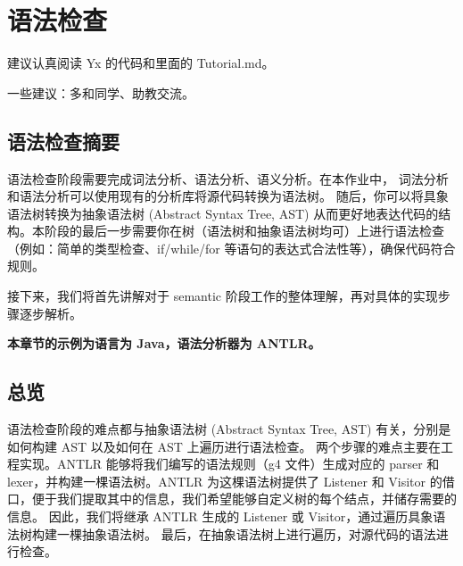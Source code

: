 \chapter{语法检查}

\begin{introduction}
    \item 建议认真阅读 Yx\cite{Yx} 的代码和里面的 Tutorial.md。
    \item 一些建议：多和同学、助教交流。
\end{introduction}


\section{语法检查摘要}
语法检查阶段需要完成词法分析、语法分析、语义分析。在本作业中，
词法分析和语法分析可以使用现有的分析库将源代码转换为语法树。
随后，你可以将具象语法树转换为抽象语法树 (Abstract Syntax Tree, AST)
从而更好地表达代码的结构。本阶段的最后一步需要你在树（语法树和抽象语法树均可）上进行语法检查
（例如：简单的类型检查、if/while/for 等语句的表达式合法性等），确保代码符合规则。

接下来，我们将首先讲解对于 semantic 阶段工作的整体理解，再对具体的实现步骤逐步解析。

\begin{remark}
    \textbf{本章节的示例为语言为 Java，语法分析器为 ANTLR。}
\end{remark}

\section{总览}
语法检查阶段的难点都与抽象语法树 (Abstract Syntax Tree, AST)
有关，分别是如何构建 AST 以及如何在 AST 上遍历进行语法检查。
两个步骤的难点主要在工程实现。ANTLR 能够将我们编写的语法规则（g4 文件）生成对应的
parser 和 lexer，并构建一棵语法树。ANTLR 为这棵语法树提供了 Listener 和 Visitor
的借口，便于我们提取其中的信息，我们希望能够自定义树的每个结点，并储存需要的信息。
因此，我们将继承 ANTLR 生成的 Listener 或 Visitor，通过遍历具象语法树构建一棵抽象语法树。
最后，在抽象语法树上进行遍历，对源代码的语法进行检查。

